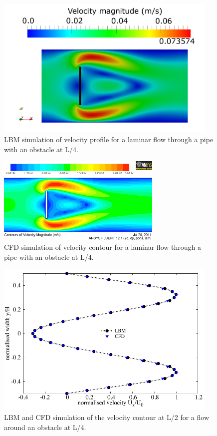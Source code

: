 \begin{figure}[!t]
\centering
\hspace{-13mm}\includegraphics[width=0.95\textwidth]{LBM_Obstacle}
\caption{LBM simulation of velocity profile for a laminar flow through a pipe 
with an obstacle at L/4.}
\label{fig:LBMobstacle}
\end{figure}

\begin{figure}[!ht]
\centering
\includegraphics[width=0.7\textwidth]{CFD_Obstacle}
\caption{CFD simulation of velocity contour for a laminar flow through a pipe 
with an obstacle at L/4.}
\label{fig:CFDobstacle}
\end{figure}

\begin{figure}[htbp]
\centering
\includegraphics[width=0.95\textwidth]{Obstacle}
\caption{LBM and CFD simulation of the velocity contour at L/2 for a flow 
around an obstacle at L/4.}
\label{fig:Obstacle}
\end{figure}


